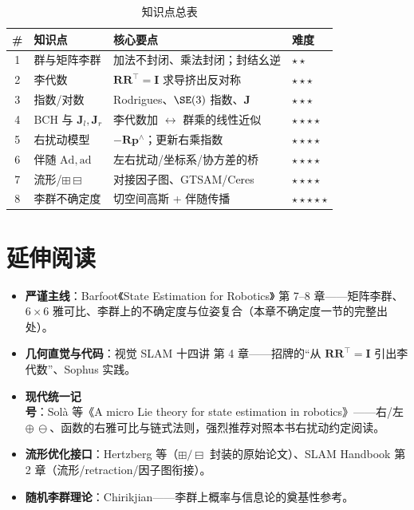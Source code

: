 \begin{table}[H]\centering\small
\caption{知识点总表}
\begin{tabular}{clll}
\toprule
\# & 知识点 & 核心要点 & 难度 \\
\midrule
1 & 群与矩阵李群 & 加法不封闭、乘法封闭；封结幺逆 & \(\star\star\) \\
2 & 李代数 & $\mathbf{R}\mathbf{R}^\top=\mathbf{I}$ 求导挤出反对称 & \(\star\star\star\) \\
3 & 指数/对数 & Rodrigues、$\SE(3)$ 指数、$\mathbf{J}$ & \(\star\star\star\) \\
4 & BCH 与 $\mathbf{J}_l,\mathbf{J}_r$ & 李代数加 $\leftrightarrow$ 群乘的线性近似 & \(\star\star\star\star\) \\
5 & 右扰动模型 & $-\mathbf{R}\mathbf{p}^\wedge$；更新右乘指数 & \(\star\star\star\star\) \\
6 & 伴随 $\mathrm{Ad},\mathrm{ad}$ & 左右扰动/坐标系/协方差的桥 & \(\star\star\star\star\) \\
7 & 流形/$\boxplus\boxminus$ & 对接因子图、GTSAM/Ceres & \(\star\star\star\star\) \\
8 & 李群不确定度 & 切空间高斯 + 伴随传播 & \(\star\star\star\star\star\) \\
\bottomrule
\end{tabular}
\end{table}

\section*{延伸阅读}
\begin{itemize}
  \item \textbf{严谨主线}：Barfoot《State Estimation for Robotics》\cite{barfoot2024state} 第 7--8 章——矩阵李群、$6\times6$ 雅可比、李群上的不确定度与位姿复合（本章不确定度一节的完整出处）。
  \item \textbf{几何直觉与代码}：视觉 SLAM 十四讲\cite{gaoxiang2019slam14} 第 4 章——招牌的“从 $\mathbf{R}\mathbf{R}^\top=\mathbf{I}$ 引出李代数”、Sophus 实践。
  \item \textbf{现代统一记号}：Solà 等《A micro Lie theory for state estimation in robotics》\cite{sola2018micro}——右/左 $\oplus\,\ominus$、函数的右雅可比与链式法则，强烈推荐对照本书右扰动约定阅读。
  \item \textbf{流形优化接口}：Hertzberg 等\cite{hertzberg2013integrating}（$\boxplus/\boxminus$ 封装的原始论文）、SLAM Handbook\cite{carlone2026handbook} 第 2 章（流形/retraction/因子图衔接）。
  \item \textbf{随机李群理论}：Chirikjian\cite{chirikjian2011stochastic}——李群上概率与信息论的奠基性参考。
\end{itemize}

